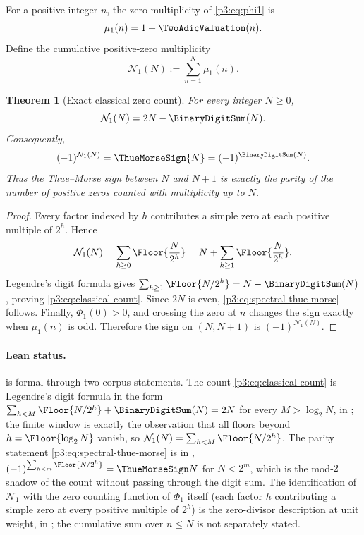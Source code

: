 \documentclass[11pt,oneside]{article}
\newtheorem{theorem}{Theorem}[section]
\theoremstyle{definition}
\theoremstyle{remark}
\begin{document}
For a positive integer $n$, the zero multiplicity of \eqref{p3:eq:phi1} is
\[
  \mu_1(n)=1+\TwoAdicValuation(n).
\]
Define the cumulative positive-zero multiplicity
\[
  \mathcal N_1(N):=\sum_{n=1}^{N}\mu_1(n).
\]

\begin{theorem}[Exact classical zero count]\label{p3:thm:classical-count}
For every integer $N\ge0$,
\begin{equation}\label{p3:eq:classical-count}
  \mathcal N_1(N)=2N-\BinaryDigitSum(N).
\end{equation}
Consequently,
\begin{equation}\label{p3:eq:spectral-thue-morse}
  (-1)^{\mathcal N_1(N)}=\ThueMorseSign{N}
  =(-1)^{\BinaryDigitSum(N)}.
\end{equation}
Thus the Thue--Morse sign between $N$ and $N+1$ is exactly the parity of the number of positive zeros counted with multiplicity up to $N$.
\end{theorem}

\begin{proof}
Every factor indexed by $h$ contributes a simple zero at each positive multiple of $2^h$.  Hence
\[
 \mathcal N_1(N)=\sum_{h\ge0}\Floor{\frac N{2^h}}
 =N+\sum_{h\ge1}\Floor{\frac N{2^h}}.
\]
Legendre's digit formula gives $\sum_{h\ge1}\Floor{N/2^h}=N-\BinaryDigitSum(N)$, proving \eqref{p3:eq:classical-count}.  Since $2N$ is even, \eqref{p3:eq:spectral-thue-morse} follows.  Finally, $\Phi_1(0)>0$, and crossing the zero at $n$ changes the sign exactly when $\mu_1(n)$ is odd.  Therefore the sign on $(N,N+1)$ is $(-1)^{\mathcal N_1(N)}$.
\end{proof}

\paragraph{Lean status.}
 is formal through two corpus statements.  The count
\eqref{p3:eq:classical-count} is Legendre's digit formula in the form
\(\sum_{h<M}\Floor{N/2^h}+\BinaryDigitSum(N)=2N\) for every \(M>\log_2N\),
 in ; the
finite window is exactly the observation that all floors beyond \(h=\Floor{\log_2N}\)
vanish, so \(\mathcal N_1(N)=\sum_{h<M}\Floor{N/2^h}\).  The parity statement
\eqref{p3:eq:spectral-thue-morse} is
 in
, \((-1)^{\sum_{h<m}\Floor{N/2^h}}=\ThueMorseSign N\)
for \(N<2^m\), which is the mod-\(2\) shadow of the count without passing through the
digit sum.  The identification of \(\mathcal N_1\) with the zero counting function of
\(\Phi_1\) itself (each factor \(h\) contributing a simple zero at every positive multiple
of \(2^h\)) is the zero-divisor description
 at unit weight, in
; the cumulative sum over \(n\le N\) is not separately
stated.
\end{document}
